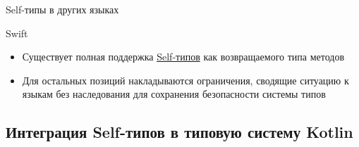 \documentclass[aspectratio=169,usenames,dvipsnames]{beamer}
\begin{document}
\begin{frame}[fragile]{Self-типы в других языках}
        \begin{block}{Swift}
            \begin{itemize}
                \item Существует полная поддержка \href{https://docs.swift.org/swift-book/documentation/the-swift-programming-language/types/\#Self-Type}{Self-типов} как возвращаемого типа методов
                \item Для остальных позиций накладываются ограничения, сводящие ситуацию к языкам без наследования для сохранения безопасности системы типов
            \end{itemize}
        \end{block}
    \end{frame}


    \subsection{Интеграция Self-типов в типовую систему Kotlin}
\end{document}
